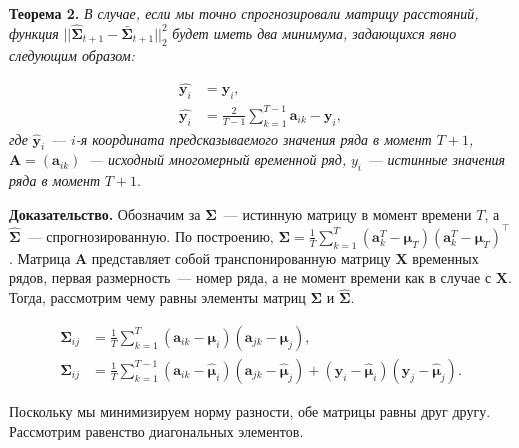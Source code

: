 \documentclass{article}
\begin{document}
\textbf{Теорема 2.} \textit{В случае, если мы точно спрогнозировали матрицу расстояний, функция} $||\hat{\mathbf{\Sigma}}_{t+1} - \bar{\mathbf{\Sigma}}_{t+1}||_2^2$ \textit{будет иметь два минимума, задающихся явно следующим образом:}

\begin{align*}
	\hat{\mathbf{y}_i} &= \mathbf{y}_i,\\
	\hat{\mathbf{y}_i} &= \frac{2}{T-1} \sum_{k=1}^{T-1} \mathbf{a}_{ik} - \mathbf{y}_i,
\end{align*}
\textit{где} $\hat{\mathbf{y}}_i$~--- $i$\textit{-я координата предсказываемого значения ряда в момент $T+1$, $\mathbf{A}=(\mathbf{a}_{ik})$~--- исходный многомерный временной ряд,} $y_i$~--- \textit{истинные значения ряда в момент} $T+1$.

\textbf{Доказательство.} Обозначим за $\mathbf{\Sigma}$~--- истинную матрицу в момент времени $T$, а $\hat{\mathbf{\Sigma}}$~--- спрогнозированную. По построению, ${\mathbf{\Sigma}} = \frac{1}{T} \sum_{k=1}^{T} (\mathbf{a}^T_k - \boldsymbol{\mu}_T)(\mathbf{a}^T_k - \boldsymbol{\mu}_T)^\intercal\texttt{}$. Матрица $\mathbf{A}$ представляет собой транспонированную матрицу $\mathbf{X}$ временных рядов, первая размерность~--- номер ряда, а не момент времени как в случае с $\mathbf{X}$. Тогда, рассмотрим чему равны элементы матриц $\mathbf{\Sigma}$ и $\hat{\mathbf{\Sigma}}$.

\begin{align*}
	\mathbf{\Sigma}_{ij} &= \frac{1}{T}\sum_{k=1}^{T}(\mathbf{a}_{ik} - \boldsymbol{\mu}_i)(\mathbf{a}_{jk}-\boldsymbol{\mu}_j),\\
	\hat{\mathbf{\Sigma}}_{ij} &= \frac{1}{T}\sum_{k=1}^{T-1}(\mathbf{a}_{ik} - \hat{\boldsymbol{\mu}}_i)(\mathbf{a}_{jk}-\hat{\boldsymbol{\mu}}_j) + (\mathbf{y}_i - \hat{\boldsymbol{\mu}}_i)(\mathbf{y}_j - \hat{\boldsymbol{\mu}}_j).
\end{align*}

Поскольку мы минимизируем норму разности, обе матрицы равны друг другу. Рассмотрим равенство диагональных элементов.
\end{document}
